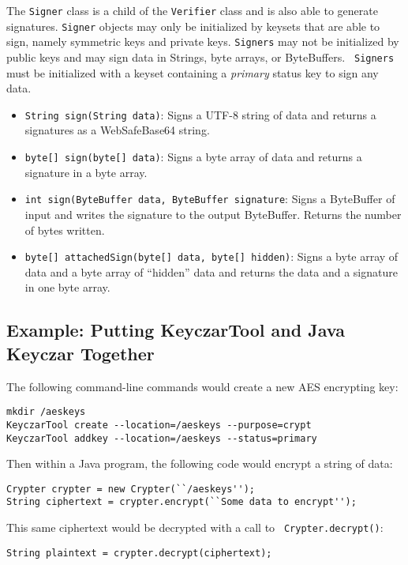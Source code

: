 \documentclass{llncs}
\begin{document}
The {\tt Signer} class is a child of the {\tt Verifier} class and is
also able to generate signatures. {\tt Signer} objects may only be
initialized by keysets that are able to sign, namely symmetric keys
and private keys. {\tt Signers} may not be initialized by public keys
and may sign data in Strings, byte arrays, or ByteBuffers. {\tt
  Signers} must be initialized with a keyset containing a {\it
  primary} status key to sign any data.

\begin{itemize}
  \item {\tt String sign(String data)}: Signs a UTF-8 string of data
    and returns a signatures as a WebSafeBase64 string.
  \item {\tt byte[] sign(byte[] data)}: Signs a byte array of data and
    returns a signature in a byte array.
  \item {\tt int sign(ByteBuffer data, ByteBuffer signature}: Signs a
    ByteBuffer of input and writes the signature to the output
    ByteBuffer.  Returns the number of bytes written.
  \item {\tt byte[] attachedSign(byte[] data, byte[] hidden)}: Signs a
    byte array of data and a byte array of ``hidden'' data and returns
    the data and a signature in one byte array.
\end{itemize}

\subsection{Example: Putting KeyczarTool and Java Keyczar Together}

The following command-line commands would create a new AES encrypting
key:

\begin{verbatim}
mkdir /aeskeys
KeyczarTool create --location=/aeskeys --purpose=crypt
KeyczarTool addkey --location=/aeskeys --status=primary
\end{verbatim}

Then within a Java program, the following code would encrypt a string
of data:

\begin{verbatim}
Crypter crypter = new Crypter(``/aeskeys'');
String ciphertext = crypter.encrypt(``Some data to encrypt'');
\end{verbatim}

This same ciphertext would be decrypted with a call to {\tt
Crypter.decrypt()}:

\begin{verbatim}
String plaintext = crypter.decrypt(ciphertext);
\end{verbatim}
\end{document}
